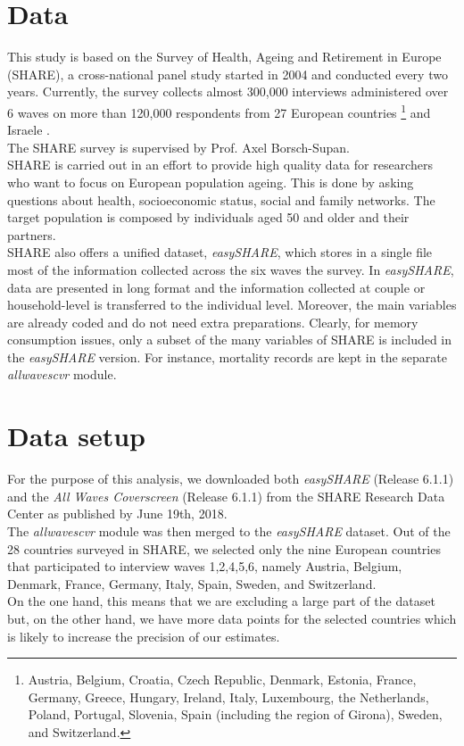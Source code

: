 \documentclass[\main/main.tex]{subfiles}
\begin{document}
\section{Data}

This study is based on the Survey of Health, Ageing and Retirement in Europe (SHARE), a cross-national panel study started in 2004 and conducted every two years. Currently, the survey collects almost 300,000 interviews administered over 6 waves on more than 120,000 respondents from 27 European countries \footnote{Austria, Belgium, Croatia, Czech Republic, Denmark, Estonia, France, Germany,
Greece, Hungary, Ireland, Italy, Luxembourg, the Netherlands, Poland, Portugal, Slovenia,
Spain (including the region of Girona), Sweden, and Switzerland.} and Israele \citep{Bergmann2017}.\\
The SHARE survey is supervised by Prof. Axel Borsch-Supan.\\


SHARE is carried out in an effort to provide high quality data for researchers who want to focus on European population ageing. This is done by asking questions about health, socioeconomic status, social and family networks. The target population is composed by individuals aged 50 and older and their partners.\\ 

SHARE also offers a unified dataset, \textit{easySHARE}, which stores in a single file most of the information collected across the six waves the survey. In \textit{easySHARE}, data are presented in long format and the information collected at couple or household-level is transferred to the individual level. Moreover, the main variables are already coded and do not need extra preparations.
Clearly, for memory consumption issues, only a subset of the many variables of SHARE is included in  the \textit{easySHARE} version. For instance, mortality records are kept in the separate \textit{allwaves\textunderscore cv\textunderscore r}  module.


\section{Data setup}
For the purpose of this analysis, we downloaded both \textit{easySHARE} (Release 6.1.1) and the \textit{All Waves Coverscreen} (Release 6.1.1) from the SHARE Research Data Center as published by June 19th, 2018.\\

The \textit{allwaves\textunderscore cv\textunderscore r} module was then merged to the \textit{easySHARE} dataset.
Out of the 28 countries surveyed in SHARE, we selected only the nine European countries that participated to interview waves 1,2,4,5,6, namely Austria, Belgium, Denmark, France, Germany, Italy, Spain, Sweden, and Switzerland.\\
On the one hand, this means that we are excluding a large part of the dataset but, on the other hand, we have more data points for the selected countries which is likely to increase the precision of our estimates.\\
\end{document}
